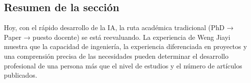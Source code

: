 \subsection{Resumen de la sección}

Hoy, con el rápido desarrollo de la IA, la ruta académica tradicional (PhD → Paper → puesto docente) se está reevaluando. La experiencia de Weng Jiayi muestra que la capacidad de ingeniería, la experiencia diferenciada en proyectos y una comprensión precisa de las necesidades pueden determinar el desarrollo profesional de una persona más que el nivel de estudios y el número de artículos publicados.

